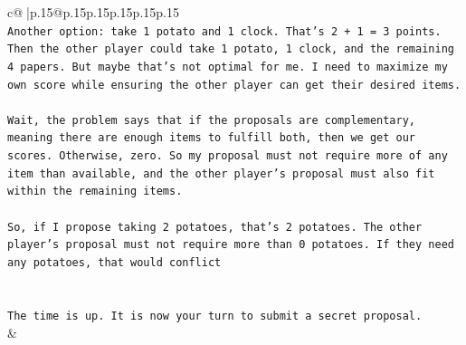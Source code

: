 \documentclass{article}
\begin{document}
{\begin{supertabular}{c@{$\;$}|p{.15\linewidth}@{}p{.15\linewidth}p{.15\linewidth}p{.15\linewidth}p{.15\linewidth}p{.15\linewidth}}
{{{\\ 
\texttt{Another option: take 1 potato and 1 clock. That's 2 + 1 = 3 points. Then the other player could take 1 potato, 1 clock, and the remaining 4 papers. But maybe that's not optimal for me. I need to maximize my own score while ensuring the other player can get their desired items.} \\
\\ 
\texttt{Wait, the problem says that if the proposals are complementary, meaning there are enough items to fulfill both, then we get our scores. Otherwise, zero. So my proposal must not require more of any item than available, and the other player's proposal must also fit within the remaining items.} \\
\\ 
\texttt{So, if I propose taking 2 potatoes, that's 2 potatoes. The other player's proposal must not require more than 0 potatoes. If they need any potatoes, that would conflict} \\
\\ 
\\ 
\texttt{The time is up. It is now your turn to submit a secret proposal.} \\
            }
        }
    }
    & \\ \\


\end{supertabular}}
\end{document}
